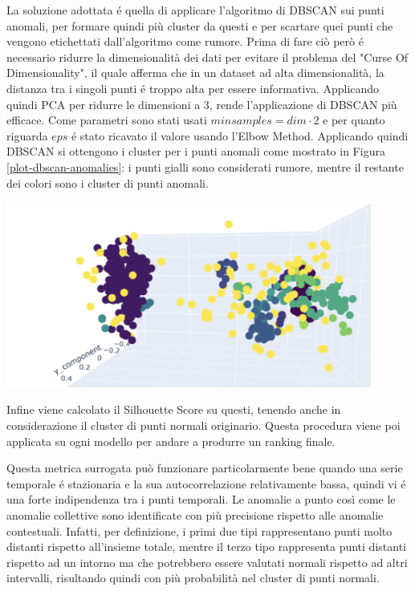 La soluzione adottata é quella di applicare l'algoritmo di DBSCAN sui punti anomali, per formare quindi più cluster da questi e per scartare quei punti che vengono etichettati dall'algoritmo come rumore.
Prima di fare ciò però é necessario ridurre la dimensionalità dei dati per evitare il problema del "Curse Of Dimensionality", il quale afferma che in un dataset ad alta dimensionalità, la distanza tra i singoli punti é troppo alta per essere informativa.
Applicando quindi PCA per ridurre le dimensioni a 3, rende l'applicazione di DBSCAN più efficace. Come parametri sono stati usati $minsamples=dim \cdot 2$ e per quanto riguarda $eps$ é stato ricavato il valore usando l'Elbow Method.
Applicando quindi DBSCAN si ottengono i cluster per i punti anomali come mostrato in Figura \ref{plot-dbscan-anomalies}: i punti gialli sono considerati rumore, mentre il restante dei colori sono i cluster di punti anomali.

\begin{center}
	\includegraphics[width=12cm, scale=1]{images/plot-dbscan-anomalies}
    \captionsetup{type=figure}
    \label{plot-dbscan-anomalies}
\end{center}

Infine viene calcolato il Silhouette Score su questi, tenendo anche in considerazione il cluster di punti normali originario. Questa procedura viene poi applicata su ogni modello per andare a produrre un ranking finale.

Questa metrica surrogata può funzionare particolarmente bene quando una serie temporale é stazionaria e la sua autocorrelazione relativamente bassa, quindi vi é una forte indipendenza tra i punti temporali. Le anomalie a punto così come le anomalie collettive sono identificate con più precisione rispetto alle anomalie contestuali. Infatti, per definizione, i primi due tipi rappresentano punti molto distanti rispetto all'insieme totale, mentre il terzo tipo rappresenta punti distanti rispetto ad un intorno ma che potrebbero essere valutati normali rispetto ad altri intervalli, risultando quindi con più probabilità nel cluster di punti normali.
